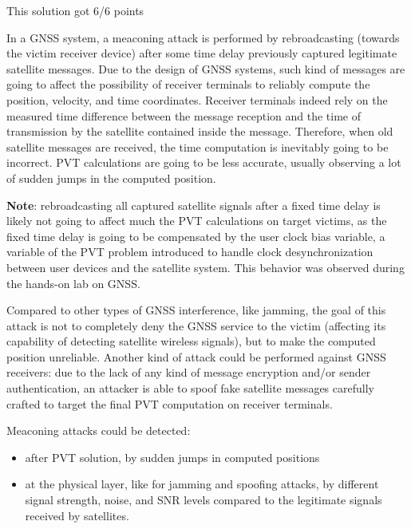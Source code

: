 \begin{solution}
    This solution got 6/6 points

    In a GNSS system, a meaconing attack is performed by rebroadcasting (towards the victim receiver device) after some time delay previously captured legitimate satellite messages. Due to the design of GNSS systems, such kind of messages are going to affect the possibility of receiver terminals to reliably compute the position, velocity, and time coordinates. Receiver terminals indeed rely on the measured time difference between the message reception and the time of transmission by the satellite contained inside the message. Therefore, when old satellite messages are received, the time computation is inevitably going to be incorrect. PVT calculations are going to be less accurate, usually observing a lot of sudden jumps in the computed position.

    \textbf{Note}: rebroadcasting all captured satellite signals after a fixed time delay is likely not going to affect much the PVT calculations on target victims, as the fixed time delay is going to be compensated by the user clock bias variable, a variable of the PVT problem introduced to handle clock desynchronization between user devices and the satellite system. This behavior was observed during the hands-on lab on GNSS.

    Compared to other types of GNSS interference, like jamming, the goal of this attack is not to completely deny the GNSS service to the victim (affecting its capability of detecting satellite wireless signals), but to make the computed position unreliable. Another kind of attack could be performed against GNSS receivers: due to the lack of any kind of message encryption and/or sender authentication, an attacker is able to spoof fake satellite messages carefully crafted to target the final PVT computation on receiver terminals.

    Meaconing attacks could be detected:
    \begin{itemize}
        \item after PVT solution, by sudden jumps in computed positions
        \item at the physical layer, like for jamming and spoofing attacks, by different signal strength, noise, and SNR levels compared to the legitimate signals received by satellites.
    \end{itemize}

\end{solution}

